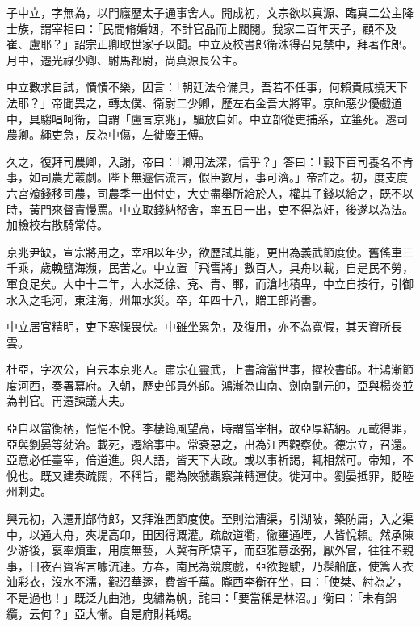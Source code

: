 \begin{pinyinscope}
 子中立，字無為，以門廕歷太子通事舍人。開成初，文宗欲以真源、臨真二公主降士族，謂宰相曰：「民間脩婚姻，不計官品而上閥閱。我家二百年天子，顧不及崔、盧耶？」詔宗正卿取世家子以聞。中立及校書郎衛洙得召見禁中，拜著作郎。月中，遷光祿少卿、駙馬都尉，尚真源長公主。



 中立數求自試，憒憒不樂，因言：「朝廷法令備具，吾若不任事，何賴貴戚撓天下法耶？」帝聞異之，轉太僕、衛尉二少卿，歷左右金吾大將軍。京師惡少優戲道中，具騶唱呵衛，自謂「盧言京兆」，驅放自如。中立部從吏捕系，立箠死。遷司農卿。繩吏急，反為中傷，左徙慶王傅。



 久之，復拜司農卿，入謝，帝曰：「卿用法深，信乎？」答曰：「轂下百司養名不肯事，如司農尤叢劇。陛下無遽信流言，假臣數月，事可濟。」帝許之。初，度支度六宮飧錢移司農，司農季一出付吏，大吏盡舉所給於人，權其子錢以給之，既不以時，黃門來督責慢罵。中立取錢納帑舍，率五日一出，吏不得為奸，後遂以為法。加檢校右散騎常侍。



 京兆尹缺，宣宗將用之，宰相以年少，欲歷試其能，更出為義武節度使。舊傜車三千乘，歲輓鹽海瀕，民苦之。中立置「飛雪將」數百人，具舟以載，自是民不勞，軍食足矣。大中十二年，大水泛徐、兗、青、鄆，而滄地積卑，中立自按行，引御水入之毛河，東注海，州無水災。卒，年四十八，贈工部尚書。



 中立居官精明，吏下寒慄畏伏。中雖坐累免，及復用，亦不為寬假，其天資所長雲。



 杜亞，字次公，自云本京兆人。肅宗在靈武，上書論當世事，擢校書郎。杜鴻漸節度河西，奏署幕府。入朝，歷吏部員外郎。鴻漸為山南、劍南副元帥，亞與楊炎並為判官。再遷諫議大夫。



 亞自以當衡柄，悒悒不悅。李棲筠風望高，時謂當宰相，故亞厚結納。元載得罪，亞與劉晏等劾治。載死，遷給事中。常袞惡之，出為江西觀察使。德宗立，召還。亞意必任臺宰，倍道進。與人語，皆天下大政。或以事祈謁，輒相然可。帝知，不悅也。既又建奏疏闊，不稱旨，罷為陜虢觀察兼轉運使。徙河中。劉晏抵罪，貶睦州刺史。



 興元初，入遷刑部侍郎，又拜淮西節度使。至則治漕渠，引湖陂，築防庸，入之渠中，以通大舟，夾堤高卬，田因得溉灌。疏啟道衢，徹壅通堙，人皆悅賴。然承陳少游後，裒率煩重，用度無藝，人冀有所矯革，而亞雅意丞弼，厭外官，往往不親事，日夜召賓客言噱流連。方春，南民為競度戲，亞欲輕駛，乃髹船底，使篙人衣油彩衣，沒水不濡，觀沼華邃，費皆千萬。隴西李衡在坐，曰：「使桀、紂為之，不是過也！」既泛九曲池，曳繡為帆，詫曰：「要當稱是林沼。」衡曰：「未有錦纜，云何？」亞大慚。自是府財耗竭。




\end{pinyinscope}
